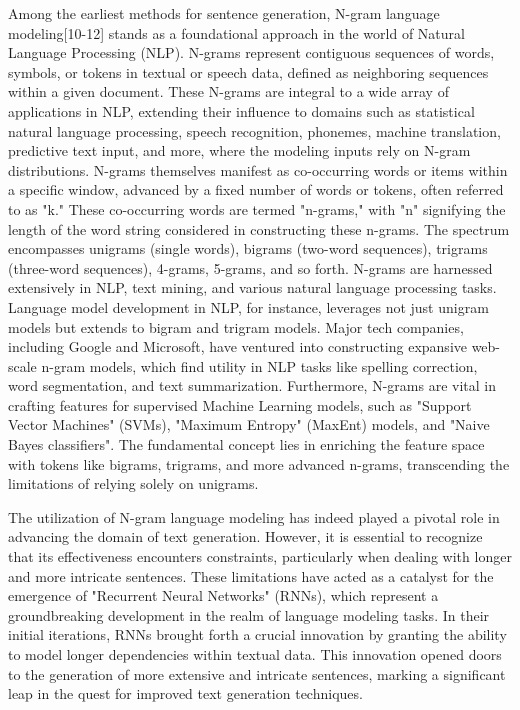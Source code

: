 \documentclass[fleqn,10pt]{thescipub} %
\begin{document}
Among the earliest methods for sentence generation, N-gram language modeling[10-12] stands as a foundational approach in the world of Natural Language Processing (NLP). N-grams represent contiguous sequences of words, symbols, or tokens in textual or speech data, defined as neighboring sequences within a given document. These N-grams are integral to a wide array of applications in NLP, extending their influence to domains such as statistical natural language processing, speech recognition, phonemes, machine translation, predictive text input, and more, where the modeling inputs rely on N-gram distributions. N-grams themselves manifest as co-occurring words or items within a specific window, advanced by a fixed number of words or tokens, often referred to as "k." These co-occurring words are termed "n-grams," with "n" signifying the length of the word string considered in constructing these n-grams. The spectrum encompasses unigrams (single words), bigrams (two-word sequences), trigrams (three-word sequences), 4-grams, 5-grams, and so forth. N-grams are harnessed extensively in NLP, text mining, and various natural language processing tasks. Language model development in NLP, for instance, leverages not just unigram models but extends to bigram and trigram models. Major tech companies, including Google and Microsoft, have ventured into constructing expansive web-scale n-gram models, which find utility in NLP tasks like spelling correction, word segmentation, and text summarization. Furthermore, N-grams are vital in crafting features for supervised Machine Learning models, such as "Support Vector Machines" (SVMs), "Maximum Entropy" (MaxEnt) models, and "Naive Bayes classifiers". The fundamental concept lies in enriching the feature space with tokens like bigrams, trigrams, and more advanced n-grams, transcending the limitations of relying solely on unigrams.




The utilization of N-gram language modeling has indeed played a pivotal role in advancing the domain of text generation. However, it is essential to recognize that its effectiveness encounters constraints, particularly when dealing with longer and more intricate sentences. These limitations have acted as a catalyst for the emergence of "Recurrent Neural Networks" (RNNs), which represent a groundbreaking development in the realm of language modeling tasks. In their initial iterations, RNNs brought forth a crucial innovation by granting the ability to model longer dependencies within textual data. This innovation opened doors to the generation of more extensive and intricate sentences, marking a significant leap in the quest for improved text generation techniques.
\end{document}
